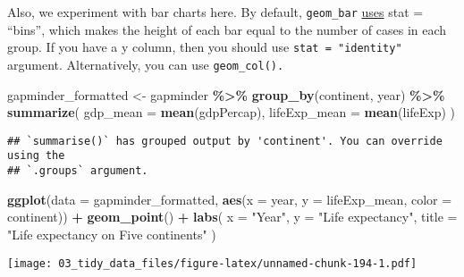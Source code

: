 \documentclass[
]{book}
\newenvironment{Shaded}{\begin{snugshade}}{\end{snugshade}}
\newcommand{\DataTypeTok}[1]{\textcolor[rgb]{0.13,0.29,0.53}{#1}}
\newcommand{\KeywordTok}[1]{\textcolor[rgb]{0.13,0.29,0.53}{\textbf{#1}}}
\newcommand{\NormalTok}[1]{#1}
\newcommand{\OperatorTok}[1]{\textcolor[rgb]{0.81,0.36,0.00}{\textbf{#1}}}
\newcommand{\StringTok}[1]{\textcolor[rgb]{0.31,0.60,0.02}{#1}}
\begin{document}
Also, we experiment with bar charts here. By default, \texttt{geom\_bar} \href{https://www.rdocumentation.org/packages/ggplot2/versions/1.0.1/topics/geom_bar}{uses} stat = ``bins'', which makes the height of each bar equal to the number of cases in each group. If you have a y column, then you should use \texttt{stat\ =\ "identity"} argument. Alternatively, you can use \texttt{geom\_col().}

\begin{Shaded}
\begin{Highlighting}[]
\NormalTok{gapminder\_formatted \textless{}{-}}\StringTok{ }\NormalTok{gapminder }\OperatorTok{\%\textgreater{}\%}
\StringTok{  }\KeywordTok{group\_by}\NormalTok{(continent, year) }\OperatorTok{\%\textgreater{}\%}
\StringTok{  }\KeywordTok{summarize}\NormalTok{(}
    \DataTypeTok{gdp\_mean =} \KeywordTok{mean}\NormalTok{(gdpPercap),}
    \DataTypeTok{lifeExp\_mean =} \KeywordTok{mean}\NormalTok{(lifeExp)}
\NormalTok{  )}
\end{Highlighting}
\end{Shaded}

\begin{verbatim}
## `summarise()` has grouped output by 'continent'. You can override using the
## `.groups` argument.
\end{verbatim}

\begin{Shaded}
\begin{Highlighting}[]
\KeywordTok{ggplot}\NormalTok{(}\DataTypeTok{data =}\NormalTok{ gapminder\_formatted, }\KeywordTok{aes}\NormalTok{(}\DataTypeTok{x =}\NormalTok{ year, }\DataTypeTok{y =}\NormalTok{ lifeExp\_mean, }\DataTypeTok{color =}\NormalTok{ continent)) }\OperatorTok{+}
\StringTok{  }\KeywordTok{geom\_point}\NormalTok{() }\OperatorTok{+}
\StringTok{  }\KeywordTok{labs}\NormalTok{(}
    \DataTypeTok{x =} \StringTok{"Year"}\NormalTok{,}
    \DataTypeTok{y =} \StringTok{"Life expectancy"}\NormalTok{,}
    \DataTypeTok{title =} \StringTok{"Life expectancy on Five continents"}
\NormalTok{  )}
\end{Highlighting}
\end{Shaded}

\texttt{[image: 03\_tidy\_data\_files/figure-latex/unnamed-chunk-194-1.pdf]}
\end{document}
